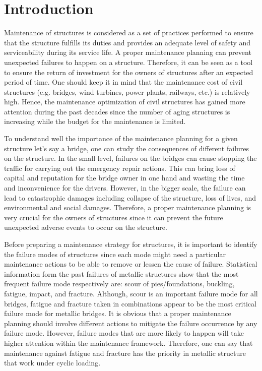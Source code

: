 

\newpage
\section*{Introduction}
\noindent
Maintenance of structures is considered as a set of practices performed to ensure that the structure fulfills its duties and provides an adequate level of safety and serviceability during 
its service life. A proper maintenance planning can prevent unexpected failures to happen on a structure. Therefore, it can be seen as a tool to ensure the return of investment for the 
owners of structures after an expected period of time. One should keep it in mind that the maintenance cost of civil structures (e.g. bridges, wind turbines, power plants, railways, etc.) 
is relatively high. Hence, the maintenance optimization of civil structures has gained more attention during the past decades since the number of aging structures is increasing while the 
budget for the maintenance is limited. 


To understand well the importance of the maintenance planning for a given structure let's say a bridge, one can study the consequences of different failures on the structure. In the small
level, failures on the bridges can cause stopping the traffic for carrying out the emergency repair actions. This can bring loss of capital and reputation for the bridge owner in one hand 
and wasting the time and inconvenience for the drivers. However, in the bigger scale, the failure can lead to catastrophic damages including collapse of the structure, loss of lives, 
and environmental and social damages. Therefore, a proper maintenance planning is very crucial for the owners of structures since it can prevent the future unexpected adverse events to 
occur on the structure. 


Before preparing a maintenance strategy for structures, it is important to identify the failure modes of structures since each mode might need a particular maintenance actions to be able 
to remove or lessen the cause of failure. Statistical information form the past failures of metallic structures show that the most frequent failure mode respectively are: scour of
pies/foundations, buckling, fatigue, impact, and fracture. Although, scour is an important failure mode for all bridges, fatigue and fracture taken in combinations appear to be the most 
critical failure mode for metallic bridges. It is obvious that a proper maintenance planning should involve different actions to mitigate the failure occurrence by any failure mode. 
However, failure modes that are more likely to happen will take higher attention within the maintenance framework. Therefore, one can say that maintenance against fatigue and fracture 
has the priority in metallic structure that work under cyclic loading. 



